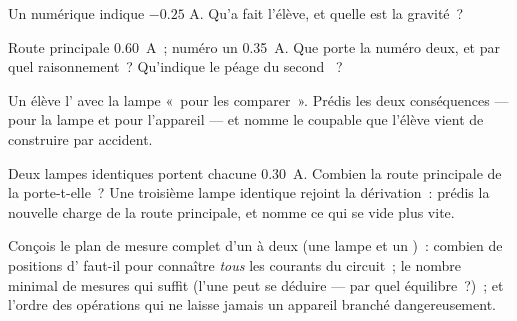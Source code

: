\begin{exercise}[$\star$]\label{exo:g8:intensity-ammeter:8}
Un  numérique indique $-0.25$ \unit{A}. Qu'a fait
l'élève, et quelle est la gravité~?
\end{exercise}

\begin{exercise}[$\star\star$]\label{exo:g8:intensity-ammeter:9}
Route principale \qty{0.60}{A}~;  numéro un \qty{0.35}{A}. Que
porte la  numéro deux, et par quel raisonnement~? Qu'indique
le péage du second ~?
\end{exercise}

\begin{exercise}[$\star\star$]\label{exo:g8:intensity-ammeter:10}
Un élève  l' \emph{} avec la lampe
«~pour les comparer~». Prédis les deux conséquences --- pour la lampe
et pour l'appareil --- et nomme le coupable que l'élève vient de
construire par accident.
\end{exercise}

\begin{exercise}[$\star\star$]\label{exo:g8:intensity-ammeter:11}
Deux lampes identiques  portent chacune \qty{0.30}{A}.
Combien la route principale de la  porte-t-elle~? Une troisième
lampe identique rejoint la dérivation~: prédis la nouvelle charge de
la route principale, et nomme ce qui se vide plus vite.
\end{exercise}

\begin{exercise}[$\star\star\star$]\label{exo:g8:intensity-ammeter:12}
Conçois le plan de mesure complet d'un  à deux
 (une lampe et un )~: combien de positions
d' faut-il pour connaître \emph{tous} les courants du
circuit~; le nombre minimal de mesures qui suffit (l'une peut se
déduire --- par quel équilibre~?)~; et l'ordre des opérations qui ne
laisse jamais un appareil branché dangereusement.
\end{exercise}

